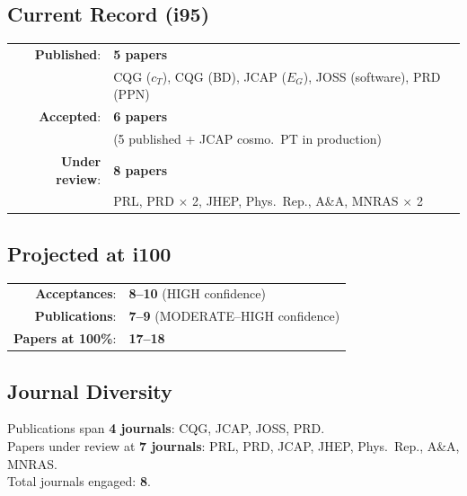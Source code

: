 \documentclass[11pt,a4paper]{article}
\begin{document}
\begin{tcolorbox}[colback=green!5!white, colframe=dfdgreen, title=\textbf{THE MID-FINAL ANSWER}]

\subsection*{Current Record (i95)}

\begin{center}
\Large
\begin{tabular}{rl}
\textbf{Published}: & \textbf{5 papers} \\
& CQG ($c_T$), CQG (BD), JCAP ($E_G$), JOSS (software), PRD (PPN) \\[6pt]
\textbf{Accepted}: & \textbf{6 papers} \\
& (5 published + JCAP cosmo.\ PT in production) \\[6pt]
\textbf{Under review}: & \textbf{8 papers} \\
& PRL, PRD $\times$ 2, JHEP, Phys.\ Rep., A\&A, MNRAS $\times$ 2 \\
\end{tabular}
\end{center}

\subsection*{Projected at i100}

\begin{center}
\Large
\begin{tabular}{rl}
\textbf{Acceptances}: & \textbf{8--10} (HIGH confidence) \\
\textbf{Publications}: & \textbf{7--9} (MODERATE--HIGH confidence) \\
\textbf{Papers at 100\%}: & \textbf{17--18} \\
\end{tabular}
\end{center}

\subsection*{Journal Diversity}

\normalsize
Publications span \textbf{4 journals}: CQG, JCAP, JOSS, PRD.\\
Papers under review at \textbf{7 journals}: PRL, PRD, JCAP, JHEP, Phys.\ Rep., A\&A, MNRAS.\\
Total journals engaged: \textbf{8}.
\end{tcolorbox}
\end{document}
